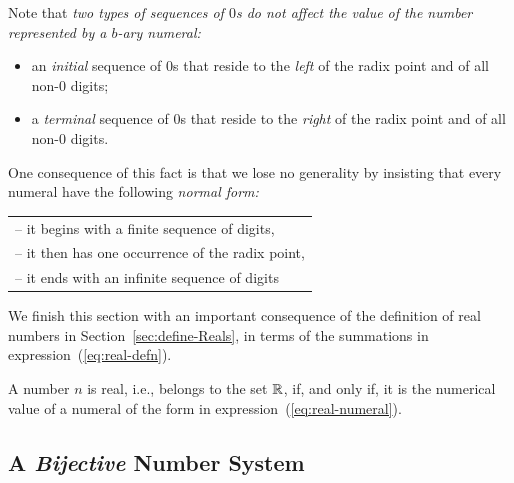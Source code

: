 Note that {\em two types of sequences of $0$s do not affect the value of the number represented by a $b$-ary numeral:}
\begin{itemize}
\item
an {\em initial} sequence of $0$s that reside to the {\em left} of the radix point and of all non-$0$ digits;
\medskip\item
a {\em terminal} sequence of $0$s that reside to the {\em right} of the radix point and of all non-$0$ digits.
\end{itemize}
One consequence of this fact is that we lose no generality by insisting that every numeral have the following {\em normal form:}

\smallskip

\hspace*{.15in}
\begin{tabular}{l}
-- it begins with a finite sequence of digits, \\
-- it then has one occurrence of the radix point, \\
-- it ends with an infinite sequence of digits
\end{tabular}

\bigskip

We finish this section with an important consequence of the definition of real numbers in Section~\ref{sec:define-Reals}, in terms of the summations in expression~(\ref{eq:real-defn}).

\begin{prop}
\label{thm:define-Reals-via-numerals}
A number $n$ is real, i.e., belongs to the set $\mathbb{R}$, if, and only if, it is the numerical value of a numeral of the form in expression~(\ref{eq:real-numeral}).
\end{prop}

\subsection{A {\em Bijective} Number System}
\label{sec:bijective-adic}

